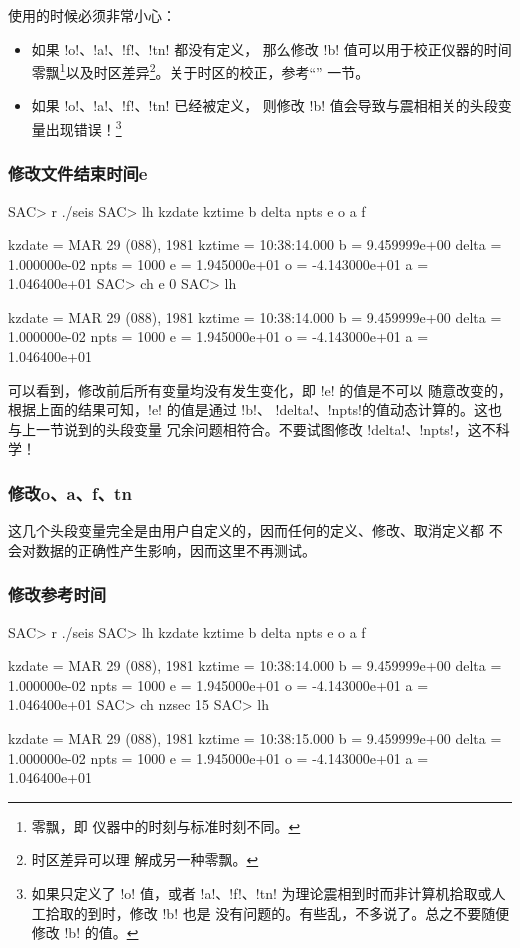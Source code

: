 使用的时候必须非常小心：
\begin{itemize}
\item 如果 !o!、!a!、!f!、!tn! 都没有定义，
    那么修改 !b! 值可以用于校正仪器的时间零飘\footnote{零飘，即
    仪器中的时刻与标准时刻不同。}以及时区差异\footnote{时区差异可以理
    解成另一种零飘。}。关于时区的校正，参考``''
    一节。
\item 如果 !o!、!a!、!f!、!tn! 已经被定义，
    则修改 !b! 值会导致与震相相关的头段变量出现错误！\footnote{
    如果只定义了 !o! 值，或者 !a!、!f!、!tn!
    为理论震相到时而非计算机拾取或人工拾取的到时，修改 !b! 也是
    没有问题的。有些乱，不多说了。总之不要随便修改 !b! 的值。}
\end{itemize}

\subsubsection{修改文件结束时间e}
\begin{SACCode}
SAC> r ./seis
SAC> lh kzdate kztime b delta npts e o a f

     kzdate = MAR 29 (088), 1981
     kztime = 10:38:14.000
          b = 9.459999e+00
      delta = 1.000000e-02
       npts = 1000
          e = 1.945000e+01
          o = -4.143000e+01
          a = 1.046400e+01
SAC> ch e 0
SAC> lh

     kzdate = MAR 29 (088), 1981
     kztime = 10:38:14.000
          b = 9.459999e+00
      delta = 1.000000e-02
       npts = 1000
          e = 1.945000e+01
          o = -4.143000e+01
          a = 1.046400e+01
\end{SACCode}

可以看到，修改前后所有变量均没有发生变化，即 !e! 的值是不可以
随意改变的，根据上面的结果可知，!e! 的值是通过 !b!、
!delta!、!npts!的值动态计算的。这也与上一节说到的头段变量
冗余问题相符合。不要试图修改 !delta!、!npts!，这不科学！

\subsubsection{修改o、a、f、tn}
这几个头段变量完全是由用户自定义的，因而任何的定义、修改、取消定义都
不会对数据的正确性产生影响，因而这里不再测试。

\subsubsection{修改参考时间}
\begin{SACCode}
SAC> r ./seis
SAC> lh kzdate kztime b delta npts e o a f

     kzdate = MAR 29 (088), 1981
     kztime = 10:38:14.000
          b = 9.459999e+00
      delta = 1.000000e-02
       npts = 1000
          e = 1.945000e+01
          o = -4.143000e+01
          a = 1.046400e+01
SAC> ch nzsec 15
SAC> lh

     kzdate = MAR 29 (088), 1981
     kztime = 10:38:15.000
          b = 9.459999e+00
      delta = 1.000000e-02
       npts = 1000
          e = 1.945000e+01
          o = -4.143000e+01
          a = 1.046400e+01
\end{SACCode}

